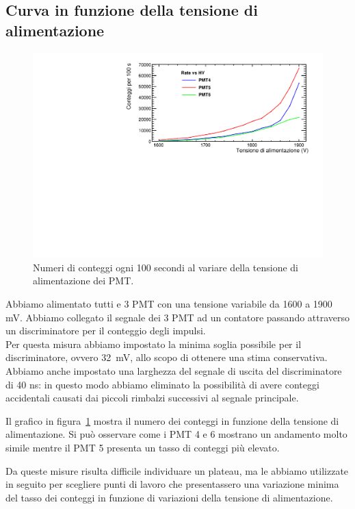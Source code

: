 \documentclass[a4paper,10pt]{article}
\begin{document}
\subsection{Curva in funzione della tensione di alimentazione}
\begin{figure}
\centering
\includegraphics[width=\textwidth]{fig/rate-hv}
\caption{Numeri di conteggi ogni 100 secondi al variare della tensione di alimentazione dei PMT.}
\label{fig:rate-hv}
\end{figure}
Abbiamo alimentato tutti e 3 PMT con una tensione variabile da 1600 a 1900 mV. Abbiamo collegato il segnale dei 3 PMT ad un contatore passando attraverso un discriminatore per il conteggio degli impulsi.\\

Per questa misura abbiamo impostato la minima soglia possibile per il discriminatore, ovvero 32~mV, allo scopo di ottenere una stima conservativa. 
Abbiamo anche impostato una larghezza del segnale di uscita del discriminatore di 40 ns: in questo modo abbiamo eliminato la possibilità di avere conteggi accidentali causati dai piccoli rimbalzi successivi al segnale principale. 

Il grafico in figura~\ref{fig:rate-hv} mostra il numero dei conteggi in funzione della tensione di alimentazione. Si può osservare come i PMT 4 e 6 mostrano un andamento molto simile mentre il PMT 5 presenta un tasso di conteggi più elevato.

Da queste misure risulta difficile individuare un plateau, ma le abbiamo utilizzate in seguito per scegliere punti di lavoro che presentassero una variazione minima del tasso dei conteggi in funzione di variazioni della tensione di alimentazione.
\end{document}
